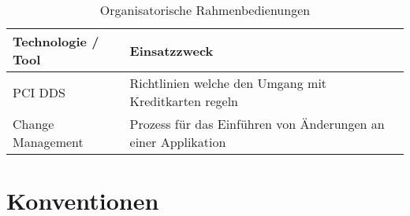 \begin{table}[H]
	\centering
	\caption{Organisatorische Rahmenbedienungen}
	\begin{tabular}{ | p{4cm} | p{12cm} | }
		\toprule
		{\textbf{Technologie / Tool}} & {\textbf{Einsatzzweck}} \\
		\midrule
		PCI DDS & Richtlinien welche den Umgang mit Kreditkarten regeln \\ \hline
		Change Management & Prozess für das Einführen von Änderungen an einer Applikation\\ 
		\bottomrule
	\end{tabular}
\end{table}

\section{Konventionen}